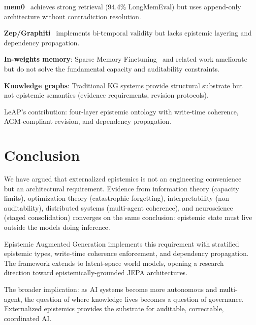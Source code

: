 \documentclass[11pt,letterpaper]{article}
\begin{document}
\textbf{mem0}~\cite{mem0} achieves strong retrieval (94.4\% LongMemEval) but uses append-only architecture without contradiction resolution.

\textbf{Zep/Graphiti}~\cite{graphiti2025} implements bi-temporal validity but lacks epistemic layering and dependency propagation.

\textbf{In-weights memory}: Sparse Memory Finetuning~\cite{sparsemem2025} and related work ameliorate but do not solve the fundamental capacity and auditability constraints.

\textbf{Knowledge graphs}: Traditional KG systems provide structural substrate but not epistemic semantics (evidence requirements, revision protocols).

LeAP's contribution: four-layer epistemic ontology with write-time coherence, AGM-compliant revision, and dependency propagation.

\section{Conclusion}

We have argued that externalized epistemics is not an engineering convenience but an architectural requirement. Evidence from information theory (capacity limits), optimization theory (catastrophic forgetting), interpretability (non-auditability), distributed systems (multi-agent coherence), and neuroscience (staged consolidation) converges on the same conclusion: epistemic state must live outside the models doing inference.

Epistemic Augmented Generation implements this requirement with stratified epistemic types, write-time coherence enforcement, and dependency propagation. The framework extends to latent-space world models, opening a research direction toward epistemically-grounded JEPA architectures.

The broader implication: as AI systems become more autonomous and multi-agent, the question of where knowledge lives becomes a question of governance. Externalized epistemics provides the substrate for auditable, correctable, coordinated AI.
\end{document}
